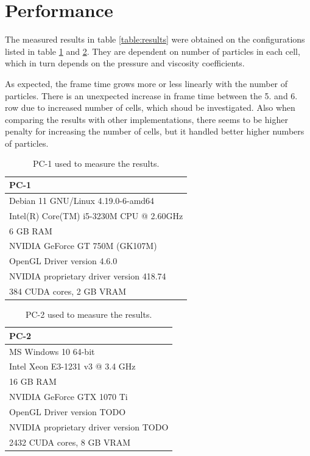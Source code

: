\documentclass[a4paper,report]{IEEEtran}
\begin{document}
\section{Performance}
The measured results in table \ref{table:results} were obtained on the configurations listed in table \ref{table:pc1} and \ref{table:pc2}. They are dependent on number of particles in each cell, which in turn depends on the pressure and viscosity coefficients.

As expected, the frame time grows more or less linearly with the number of particles. There is an unexpected increase in frame time between the 5. and 6. row due to increased number of cells, which shoud be investigated. Also when comparing the results with other implementations, there seems to be higher penalty for increasing the number of cells, but it handled better higher numbers of particles.
\begin{table}[!htbp]
	\begin{tabular}{l}
		\hline
		\textbf{PC-1} \\
		\hline
		Debian 11 GNU/Linux 4.19.0-6-amd64 \\
		Intel(R) Core(TM) i5-3230M CPU @ 2.60GHz \\
		6 GB RAM \\
		NVIDIA GeForce GT 750M (GK107M) \\
		OpenGL Driver version 4.6.0 \\
		NVIDIA proprietary driver version 418.74 \\
		384 CUDA cores, 2 GB VRAM \\
	\end{tabular}
	\caption{PC-1 used to measure the results.}
	\label{table:pc1}
\end{table}

\begin{table}[!htbp]
\begin{tabular}{l}
\hline
\textbf{PC-2} \\
\hline
	MS Windows 10 64-bit \\
	Intel Xeon E3-1231 v3 @ 3.4 GHz \\
	16 GB RAM \\
	NVIDIA GeForce GTX 1070 Ti \\
	OpenGL Driver version TODO \\
	NVIDIA proprietary driver version TODO \\
	2432 CUDA cores, 8 GB VRAM \\
\end{tabular}
	\caption{PC-2 used to measure the results.}
	\label{table:pc2}
\end{table}
\end{document}

